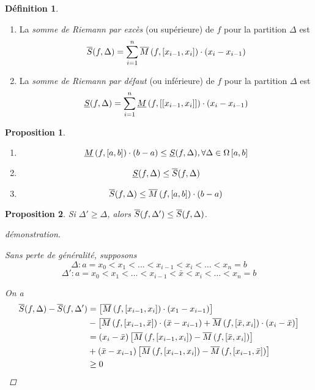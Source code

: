 \documentclass{report}
\newtheorem*{prop}{Proposition}
\theoremstyle{definition}
\newtheorem*{defin}{D\'efinition}
\theoremstyle{remark}
\begin{document}
	\begin{defin}
		~

		\begin{enumerate}[label=\alph*)]
			\item La \emph{somme de Riemann par exc\`es} (ou sup\'erieure) de $f$ pour la partition $\Delta$ est
			\[
			\ssup{f}= \displaystyle\sum_{i=1}^{n}\msup{f}[x_{i-1},x_i] \cdot (x_i-x_{i-1})
			\]
			\item La \emph{somme de Riemann par d\'efaut} (ou inf\'erieure) de $f$ pour la partition $\Delta$ est
			\[
			\sinf{f}= \displaystyle\sum_{i=1}^{n}\minf{f}[\left[ x_{i-1},x_i \right]] \cdot (x_i-x_{i-1})
			\]
		\end{enumerate}
	\end{defin}

	\newpage
	\begin{prop}
		~

		\begin{enumerate}[label=\alph*)]
			\item
			\[
			\minf{f} \cdot (b-a) \leq \sinf{f}, \forall\Delta\in\partitions
			\]
			\item
			\[
			\sinf{f} \leq \ssup{f}
			\]
			\item
			\[
			\ssup{f} \leq \msup{f} \cdot (b-a)
			\]
		\end{enumerate}
	\end{prop}

	\begin{prop}
		Si $\Delta'\geq\Delta$, alors $\ssup{f}[\Delta']\leq\ssup{f}$.
		\begin{proof}[d\'emonstration]~

			Sans perte de g\'en\'eralit\'e, supposons
			\[
			\Delta:a=x_0<x_1<\dotsc<x_{i-1}<x_i<\dotsc<x_n=b
			\]
			\[
			\Delta':a=x_0<x_1<\dotsc<x_{i-1}<\bar{x}<x_i<\dotsc<x_n=b
			\]

			On a
			\begin{align*}
				\ssup{f}-\ssup{f}[\Delta']&= \left[ \msup{f}[x_{i-1},x_i] \cdot (x_1-x_{i-1}) \right]\\
				&- \left[ \msup{f}[x_{i-1},\bar{x}] \cdot (\bar{x}-x_{i-1}) + \msup{f}[\bar{x},x_i] \cdot (x_i-\bar{x}) \right]\\
				&= (x_i-\bar{x}) \left[ \msup{f}[x_{i-1},x_i] - \msup{f}[\bar{x},x_i] \right]\\
				&+ (\bar{x}-x_{i-1}) \left[ \msup{f}[x_{i-1},x_i] - \msup{f}[x_{i-1},\bar{x}] \right]\\
				&\geq 0
			\end{align*}
		\end{proof}
	\end{prop}
\end{document}
